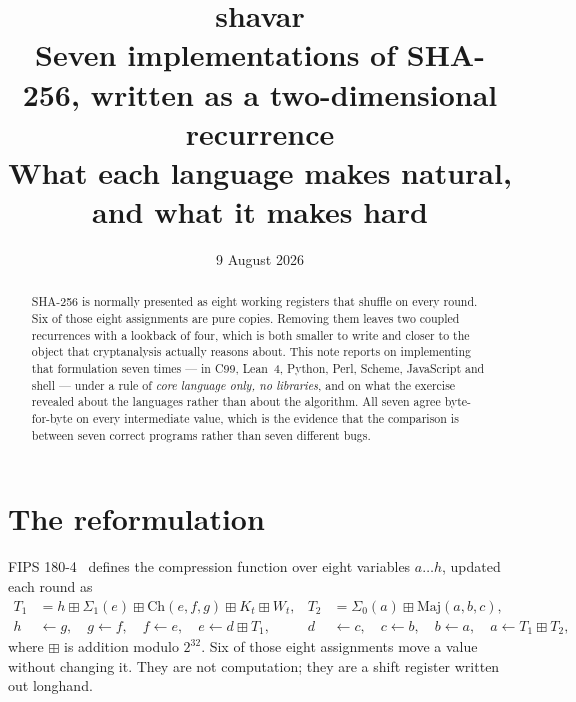 \documentclass[11pt,a4paper]{article}
\title{\textbf{shavar}\\[0.3em]
  \large Seven implementations of SHA-256, written as a two-dimensional
  recurrence\\[0.4em]
  \normalsize What each language makes natural, and what it makes hard}
\author{}
\date{9 August 2026}
\begin{document}
\maketitle

\begin{abstract}
\noindent
SHA-256 is normally presented as eight working registers that shuffle on every
round. Six of those eight assignments are pure copies. Removing them leaves two
coupled recurrences with a lookback of four, which is both smaller to write and
closer to the object that cryptanalysis actually reasons about. This note
reports on implementing that formulation seven times --- in C99, Lean~4,
Python, Perl, Scheme, JavaScript and shell --- under a rule of \emph{core
language only, no libraries}, and on what the exercise revealed about the
languages rather than about the algorithm. All seven agree byte-for-byte on
every intermediate value, which is the evidence that the comparison is between
seven correct programs rather than seven different bugs.
\end{abstract}

\tableofcontents
\bigskip

\section{The reformulation}
\label{sec:reform}

FIPS 180-4~\cite{fips180-4} defines the compression function over eight
variables $a \ldots h$, updated each round as
%
\begin{align*}
T_1 &= h \boxplus \Sigma_1(e) \boxplus \mathrm{Ch}(e,f,g) \boxplus K_t \boxplus W_t, &
T_2 &= \Sigma_0(a) \boxplus \mathrm{Maj}(a,b,c),\\
h &\leftarrow g,\quad g \leftarrow f,\quad f \leftarrow e,\quad e \leftarrow d \boxplus T_1, &
d &\leftarrow c,\quad c \leftarrow b,\quad b \leftarrow a,\quad a \leftarrow T_1 \boxplus T_2,
\end{align*}
%
where $\boxplus$ is addition modulo $2^{32}$. Six of those eight assignments
move a value without changing it. They are not computation; they are a shift
register written out longhand.
\end{document}
